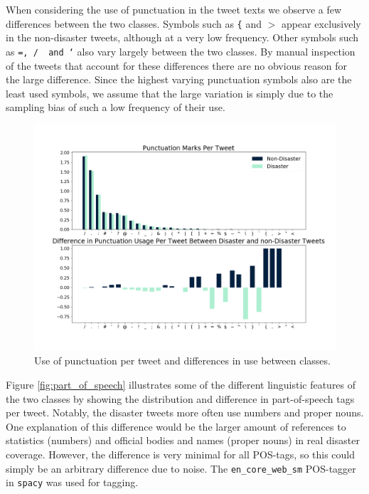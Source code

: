 \documentclass[journal, ]{IEEEtran}
\let\MYoriglatexcaption\caption
\renewcommand{\caption}[2][\relax]{\MYoriglatexcaption[#2]{#2}}
\begin{document}
When considering the use of punctuation in the tweet texts we observe a few
differences between the two classes. Symbols such as \texttt{\{} and \texttt{$>$}
appear exclusively in the non-disaster tweets, although at a very low
frequency. Other symbols such as \texttt{=, /\, and `} also vary largely
between the two classes. By manual inspection of the tweets that account for
these differences there are no obvious reason for the large difference. Since
the highest varying punctuation symbols also are the least used symbols, we
assume that the large variation is simply due to the sampling bias of such a
low frequency of their use. 
\begin{figure}[hbt!]
  \centering
  \includegraphics[width=\linewidth]{../figures/punctuation.png}
  \caption{Use of punctuation per tweet and differences in use between classes.}
  \label{fig:punctuation}
\end{figure}

Figure \ref{fig:part_of_speech} illustrates some of the different linguistic
features of the two classes by showing the distribution and difference in
part-of-speech tags per tweet. Notably, the disaster tweets more often use
numbers and proper nouns. One explanation of this difference would be the
larger amount of references to statistics (numbers) and official bodies and
names (proper nouns) in real disaster coverage. However, the difference is very
minimal for all POS-tags, so this could simply be an arbitrary difference due
to noise. The \texttt{en\_core\_web\_sm} POS-tagger in \texttt{spacy} was used for
tagging.
\end{document}
